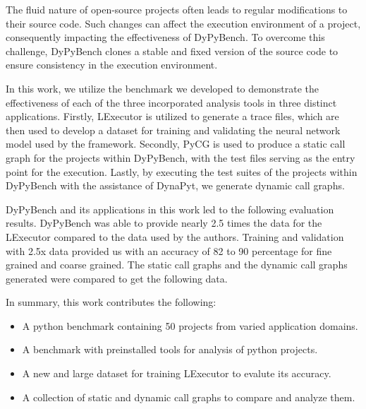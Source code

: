 The fluid nature of open-source projects often leads to regular modifications to their source code.
Such changes can affect the execution environment of a project, consequently impacting the effectiveness of DyPyBench.
To overcome this challenge, DyPyBench clones a stable and fixed version of the source code to ensure consistency in the execution environment.

In this work, we utilize the benchmark we developed to demonstrate the effectiveness of each of the three incorporated analysis tools in three distinct applications.
Firstly, LExecutor is utilized to generate a trace files, which are then used to develop a dataset for training and validating the neural network model used by the framework.
Secondly, PyCG is used to produce a static call graph for the projects within DyPyBench, with the test files serving as the entry point for the execution.
Lastly, by executing the test suites of the projects within DyPyBench with the assistance of DynaPyt, we generate dynamic call graphs.

DyPyBench and its applications in this work led to the following evaluation results. 
DyPyBench was able to provide nearly 2.5 times the data for the LExecutor compared to the data used by the authors.
Training and validation with 2.5x data provided us with an accuracy of 82 to 90 percentage for fine grained and coarse grained.
The static call graphs and the dynamic call graphs generated were compared to get the following data. 

In summary, this work contributes the following:
\begin{itemize}
    \item A python benchmark containing 50 projects from varied application domains.
    \item A benchmark with preinstalled tools for analysis of python projects.
    \item A new and large dataset for training LExecutor to evalute its accuracy.
    \item A collection of static and dynamic call graphs to compare and analyze them.
\end{itemize}
